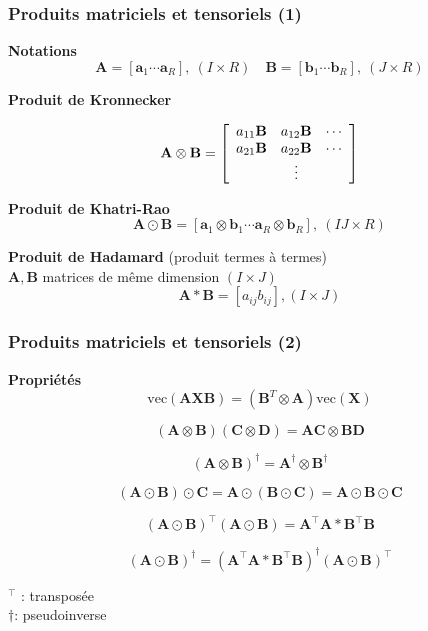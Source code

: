 \documentclass[9pt,table]{beamer} %
\begin{document}
\begin{frame}
\frametitle{Produits matriciels et tensoriels (1)}
\textbf{Notations}
$$ \mathbf{A} = [\mathbf{a}_1 \cdots \mathbf{a}_R], \ (I \times R)
\quad
\mathbf{B} = [\mathbf{b}_1 \cdots \mathbf{b}_R], \ (J \times R)$$

\textbf{Produit de Kronnecker}

$$ \mathbf{A} \otimes  \mathbf{B}  =
 \left[   \begin{array}{ c c c}
a_{11} \mathbf{B}    &  a_{12} \mathbf{B} & \cdots    \\
a_{21} \mathbf{B}    &  a_{22}  \mathbf{B}& \cdots    \\
                                             &  \vdots                                &     
\end{array} \right]
$$

\textbf{Produit de Khatri-Rao}
 $$ \mathbf{A} \odot  \mathbf{B}  =  [\mathbf{a}_1 \otimes  \mathbf{b}_1 \cdots \mathbf{a}_R  \otimes  \mathbf{b}_R], \ (IJ \times R)$$
 
\textbf{Produit de Hadamard} (produit termes à termes)\\
$\mathbf{A}, \mathbf{B}$ matrices de même dimension $(I \times J)$ 
$$ \mathbf{A} \ast  \mathbf{B}  = [ a_{ij} b_{ij}] , (I \times J)$$
\end{frame}

\begin{frame}
\frametitle{Produits matriciels et tensoriels (2)}

\textbf{Propriétés}\\

\[
\boxed{\text{vec}(\mathbf{A} \mathbf{X}  \mathbf{B}) = (\mathbf{B}^{T} \otimes \mathbf{A})\text{vec}(\mathbf{X})} 
\]

$$
(\mathbf{A} \otimes  \mathbf{B}  ) (\mathbf{C} \otimes  \mathbf{D}  ) = \mathbf{A}   \mathbf{C}  \otimes \mathbf{B}   \mathbf{D} 
$$

$$
(\mathbf{A} \otimes  \mathbf{B}  )^\dagger = \mathbf{A}^\dagger \otimes  \mathbf{B}^\dagger  
$$


$$
(\mathbf{A} \odot  \mathbf{B}  )\odot \mathbf{C} = \mathbf{A} \odot (\mathbf{B}  \odot \mathbf{C} ) = \mathbf{A} \odot  \mathbf{B}  \odot \mathbf{C}
$$

$$
(\mathbf{A} \odot  \mathbf{B} )^\top (\mathbf{A} \odot  \mathbf{B} ) = \mathbf{A}^\top \mathbf{A} \ast   \mathbf{B}^\top \mathbf{B}
$$

$$
(\mathbf{A} \odot  \mathbf{B} )^\dagger = (\mathbf{A}^\top \mathbf{A} \ast   \mathbf{B}^\top \mathbf{B})^\dagger (\mathbf{A} \odot  \mathbf{B} )^\top
$$



$^\top$ : transposée\\
$\dagger$: pseudoinverse

\end{frame}
\end{document}

